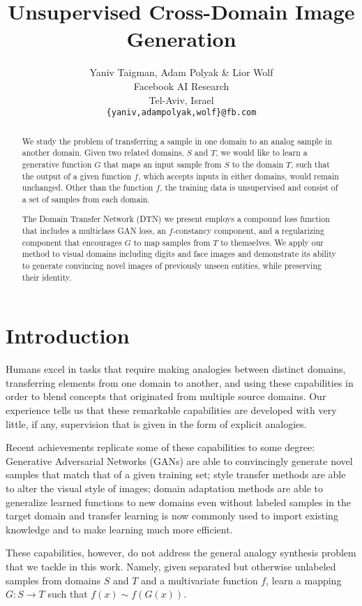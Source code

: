 \documentclass{article} \usepackage{iclr2017_conference,times}
\title{Unsupervised Cross-Domain Image Generation}
\author{Yaniv Taigman, Adam Polyak \& Lior Wolf\\
Facebook AI Research\\
Tel-Aviv, Israel \\
\texttt{\{yaniv,adampolyak,wolf\}@fb.com} \\
}
\begin{document}
\maketitle

\begin{abstract}
We study the problem of transferring a sample in one domain to an analog sample in another domain. Given two related domains, $S$ and $T$, we would like to learn a generative function $G$ that maps an input sample from $S$ to the domain $T$, such that the output of a given function $f$, which accepts inputs in either domains, would remain unchanged. Other than the function $f$, the training data is unsupervised and consist of a set of samples from each domain.

The Domain Transfer Network (DTN) we present employs a compound loss function that includes a multiclass GAN loss, an $f$-constancy component, and a regularizing component that encourages $G$ to map samples from $T$ to themselves. We apply our method to visual domains including digits and face images and demonstrate its ability to generate convincing novel images of previously unseen entities, while preserving their identity. 

\end{abstract}

\section{Introduction}

Humans excel in tasks that require making analogies between distinct domains, transferring elements from one domain to another, and using these capabilities in order to blend concepts that originated from multiple source domains. Our experience tells us that these remarkable capabilities are developed with very little, if any, supervision that is given in the form of explicit analogies.

Recent achievements replicate some of these capabilities to some degree: Generative Adversarial Networks (GANs) are able to convincingly generate novel samples that match that of a given training set; style transfer methods are able to alter the visual style of images; domain adaptation methods are able to generalize learned functions to new domains even without labeled samples in the target domain and transfer learning is now commonly used to import existing knowledge and to make learning much more efficient. 

These capabilities, however, do not address the general analogy synthesis problem that we tackle in this work. Namely, given separated but otherwise unlabeled samples from domains $S$ and $T$ and a multivariate function $f$, learn a mapping $G:S\rightarrow T$ such that $f(x) \sim f(G(x))$. 
\end{document}
